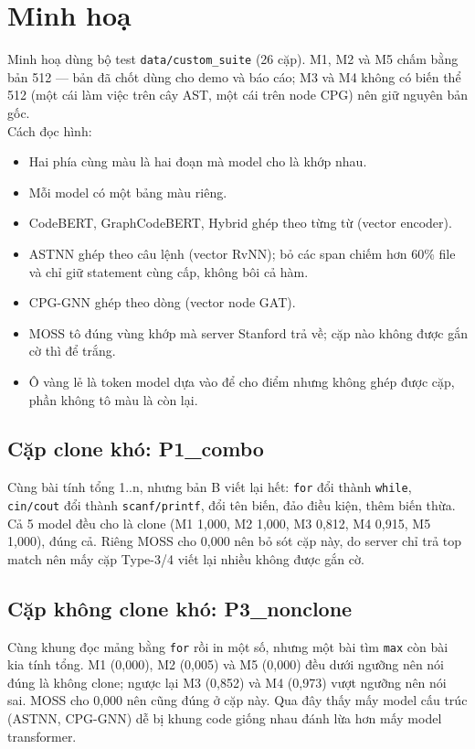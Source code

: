 \documentclass[11pt,a4paper]{article}
\begin{document}
\section{Minh hoạ}
Minh hoạ dùng bộ test \texttt{data/custom\_suite} (26 cặp). M1, M2 và M5 chấm bằng bản
512 — bản đã chốt dùng cho demo và báo cáo; M3 và M4 không có biến thể 512 (một cái làm
việc trên cây AST, một cái trên node CPG) nên giữ nguyên bản gốc.\\[2pt]
Cách đọc hình:
\begin{itemize}[leftmargin=*,itemsep=0pt,topsep=2pt,parsep=0pt]
\item Hai phía cùng màu là hai đoạn mà model cho là khớp nhau.
\item Mỗi model có một bảng màu riêng.
\item CodeBERT, GraphCodeBERT, Hybrid ghép theo từng từ (vector encoder).
\item ASTNN ghép theo câu lệnh (vector RvNN); bỏ các span chiếm hơn 60\% file
  và chỉ giữ statement cùng cấp, không bôi cả hàm.
\item CPG-GNN ghép theo dòng (vector node GAT).
\item MOSS tô đúng vùng khớp mà server Stanford trả về; cặp nào không được
  gắn cờ thì để trắng.
\item Ô \colorbox{evyellow!30}{vàng} lẻ là token model dựa vào để cho điểm
  nhưng không ghép được cặp, phần không tô màu là còn lại.
\end{itemize}

\subsection{Cặp clone khó: P1\_combo}
Cùng bài tính tổng 1..n, nhưng bản B viết lại hết: \texttt{for} đổi thành
\texttt{while}, \texttt{cin/cout} đổi thành \texttt{scanf/printf}, đổi tên biến,
đảo điều kiện, thêm biến thừa.
Cả 5 model đều cho là clone (M1 1,000, M2 1,000, M3 0,812, M4 0,915, M5 1,000), đúng cả.
Riêng MOSS cho 0,000 nên bỏ sót cặp này, do server chỉ trả top match nên mấy cặp
Type-3/4 viết lại nhiều không được gắn cờ.
{
}

\subsection{Cặp không clone khó: P3\_nonclone}
Cùng khung đọc mảng bằng \texttt{for} rồi in một số, nhưng một bài tìm
\texttt{max} còn bài kia tính tổng.
M1 (0,000), M2 (0,005) và M5 (0,000) đều dưới ngưỡng nên nói đúng là không clone;
ngược lại M3 (0,852) và M4 (0,973) vượt ngưỡng nên nói sai.
MOSS cho 0,000 nên cũng đúng ở cặp này.
Qua đây thấy mấy model cấu trúc (ASTNN, CPG-GNN) dễ bị khung code giống nhau
đánh lừa hơn mấy model transformer.
{
}
\end{document}
